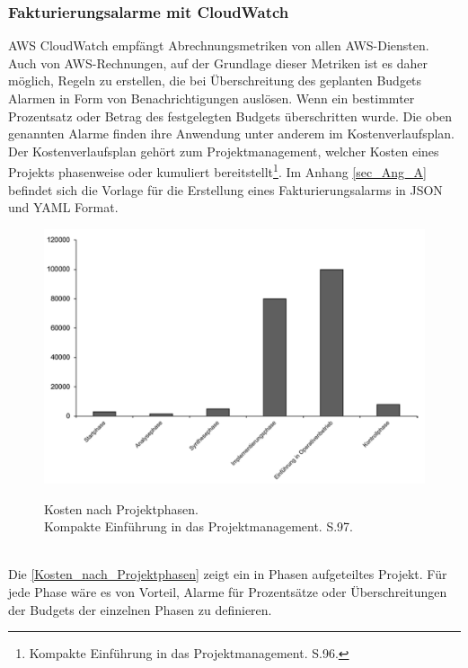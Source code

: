 \subsubsection*{Fakturierungsalarme mit CloudWatch}
AWS CloudWatch empfängt Abrechnungsmetriken von allen AWS-Diensten. Auch von AWS-Rechnungen, auf der Grundlage dieser Metriken ist es daher möglich, Regeln zu erstellen, die bei Überschreitung des geplanten Budgets Alarmen in Form von Benachrichtigungen auslösen.
Wenn ein bestimmter Prozentsatz oder Betrag des festgelegten Budgets überschritten wurde. Die oben genannten Alarme finden ihre Anwendung unter anderem im Kostenverlaufsplan. Der Kostenverlaufsplan gehört zum Projektmanagement, welcher Kosten eines Projekts phasenweise oder kumuliert bereitstellt\footnote{Kompakte Einführung in das Projektmanagement. S.96\cite{PM1}.}. Im Anhang \ref{sec_Ang_A} befindet sich die Vorlage für die Erstellung eines Fakturierungsalarms in JSON und YAML Format.
\begin{figure}[h!]
  \centering
  \includegraphics[scale=0.5]{sources/Kosten_nach_Projektphasen}
  \caption[Kosten nach Projektphasen]{}
  \label{fig:Kosten_nach_Projektphasen} 
  Kosten nach Projektphasen.\\
  Kompakte Einführung in das Projektmanagement. S.97\cite{PM1}.
\end{figure}
\\
Die \autoref{Kosten_nach_Projektphasen} zeigt ein in Phasen aufgeteiltes Projekt. Für jede Phase wäre es von Vorteil, Alarme für Prozentsätze oder Überschreitungen der Budgets der einzelnen Phasen zu definieren.
